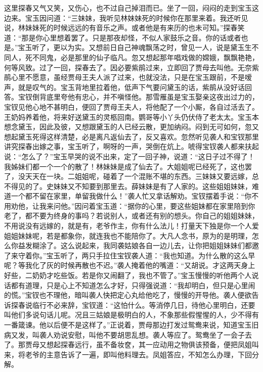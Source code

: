 \begin{parag}
    这里探春又气又笑，又伤心，也不过自己掉泪而已。坐了一回，闷闷的走到宝玉这边来。宝玉因问道：“三妹妹，我听见林妹妹死的时候你在那里来着。我还听见说，林妹妹死的时候远远的有音乐之声。或者他是有来历的也未可知。”探春笑道：“那是你心里想着罢了。只是那夜却怪，不似人家鼓乐之音。你的话或者也是。”宝玉听了，更以为实。又想前日自己神魂飘荡之时，曾见一人，说是黛玉生不同人，死不同鬼，必是那里的仙子临凡。忽又想起那年唱戏做的嫦娥，飘飘艳艳，何等风致。过了一回，探春去了。因必要紫鹃过来，立即回了贾母去叫他。无奈紫鹃心里不愿意，虽经贾母王夫人派了过来，也就没法，只是在宝玉跟前，不是嗳声，就是叹气的。宝玉背地里拉着他，低声下气要问黛玉的话，紫鹃从没好话回答。宝钗倒背底里夸他有忠心，并不嗔怪他。那雪雁虽是宝玉娶亲这夜出过力的，宝钗见他心地不甚明白，便回了贾母王夫人，将他配了一个小厮，各自过活去了。王奶妈养着他，将来好送黛玉的灵柩回南。鹦哥等小丫头仍伏侍了老太太。宝玉本想念黛玉，因此及彼，又想跟黛玉的人已经云散，更加纳闷。闷到无可如何，忽又想起黛玉死得这样清楚，必是离凡返仙去了，反又喜欢。忽然听见袭人和宝钗那里讲究探春出嫁之事，宝玉听了，啊呀的一声，哭倒在炕上。唬得宝钗袭人都来扶起说：“怎么了？”宝玉早哭的说不出来，定了一回子神，说道：“这日子过不得了！我姊妹们都一个一个的散了！林妹妹是成了仙去了。大姐姐呢已经死了，这也罢了，没天天在一块。二姐姐呢，碰着了一个混账不堪的东西。三妹妹又要远嫁，总不得见的了。史妹妹又不知要到那里去。薛妹妹是有了人家的。这些姐姐妹妹，难道一个都不留在家里，单留我做什么！”袭人忙又拿话解劝。宝钗摆着手说：“你不用劝他，让我来问他。”因问着宝玉道：“据你的心里，要这些姐妹都在家里陪到你老了，都不要为终身的事吗？若说别人，或者还有别的想头。你自己的姐姐妹妹，不用说没有远嫁的，就是有，老爷作主，你有什么法儿！打量天下独是你一个人爱姐姐妹妹呢，若是都象你，就连我也不能陪你了。大凡人念书，原为的是明理，怎么你益发糊涂了。这么说起来，我同袭姑娘各自一边儿去，让你把姐姐妹妹们都邀了来守着你。”宝玉听了，两只手拉住宝钗袭人道：“我也知道。为什么散的这么早呢？等我化了灰的时候再散也不迟。”袭人掩着他的嘴道：“又胡说。才这两天身上好些，二奶奶才吃些饭。若是你又闹翻了，我也不管了。”宝玉慢慢的听他两个人说话都有道理，只是心上不知道怎么才好，只得强说道：“我却明白，但只是心里闹的慌。”宝钗也不理他，暗叫袭人快把定心丸给他吃了，慢慢的开导他。袭人便欲告诉探春说临行不必来辞，宝钗道：“这怕什么。等消停几日，待他心里明白，还要叫他们多说句话儿呢。况且三姑娘是极明白的人，不象那些假惺惺的人，少不得有一番箴谏。他以后便不是这样了。”正说着，贾母那边打发过鸳鸯来说，知道宝玉旧病又发，叫袭人劝说安慰，叫他不要胡思乱想。袭人等应了。鸳鸯坐了一会子去了。那贾母又想起探春远行，虽不备妆奁，其一应动用之物俱该预备，便把凤姐叫来，将老爷的主意告诉了一遍，即叫他料理去。凤姐答应，不知怎么办理，下回分解。
\end{parag}